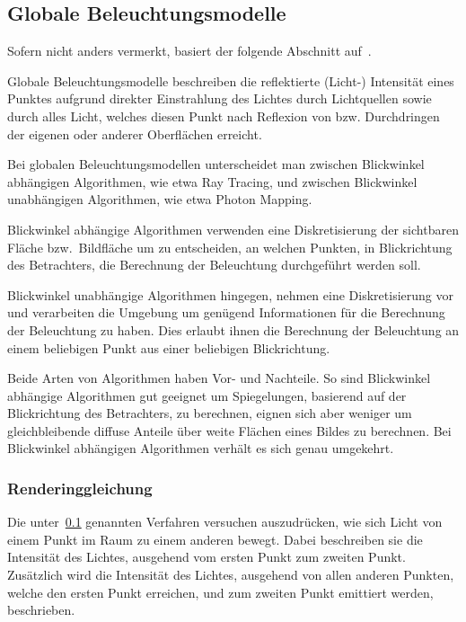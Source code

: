 \subsection{Globale Beleuchtungsmodelle}
\label{subsec:global_illumination_models}

Sofern nicht anders vermerkt, basiert der folgende Abschnitt
auf~\cite[S. 775ff]{foley_computer_1996}.

Globale Beleuchtungsmodelle beschreiben die reflektierte (Licht-) Intensität
eines Punktes aufgrund direkter Einstrahlung des Lichtes durch Lichtquellen sowie
durch alles Licht, welches diesen Punkt nach Reflexion von bzw. Durchdringen
der eigenen oder anderer Oberflächen erreicht.

Bei globalen Beleuchtungsmodellen unterscheidet man zwischen
Blickwinkel abhängigen Algorithmen, wie etwa Ray Tracing, und zwischen
Blickwinkel unabhängigen Algorithmen, wie etwa Photon Mapping.

Blickwinkel abhängige Algorithmen verwenden eine Diskretisierung der sichtbaren
Fläche bzw.\ Bildfläche um zu entscheiden, an welchen Punkten, in Blickrichtung
des Betrachters, die Berechnung der Beleuchtung durchgeführt werden soll.

Blickwinkel unabhängige Algorithmen hingegen, nehmen eine
Diskretisierung vor und verarbeiten die Umgebung um genügend
Informationen für die Berechnung der Beleuchtung zu haben.  Dies erlaubt
ihnen die Berechnung der Beleuchtung an einem beliebigen Punkt aus einer
beliebigen Blickrichtung.

Beide Arten von Algorithmen haben Vor- und Nachteile. So sind
Blickwinkel abhängige Algorithmen gut geeignet um Spiegelungen,
basierend auf der Blickrichtung des Betrachters, zu berechnen, eignen
sich aber weniger um gleichbleibende diffuse Anteile über weite Flächen
eines Bildes zu berechnen.  Bei Blickwinkel abhängigen Algorithmen
verhält es sich genau umgekehrt.

\subsubsection{Renderinggleichung}
\label{ssubsec:rendering_equation}

Die unter~\ref{subsec:global_illumination_models} genannten Verfahren versuchen
auszudrücken, wie sich Licht von einem Punkt im Raum zu einem anderen bewegt.
Dabei beschreiben sie die Intensität des Lichtes, ausgehend vom ersten Punkt
zum zweiten Punkt. Zusätzlich wird die Intensität des Lichtes, ausgehend von
allen anderen Punkten, welche den ersten Punkt erreichen, und zum zweiten Punkt
emittiert werden, beschrieben.

